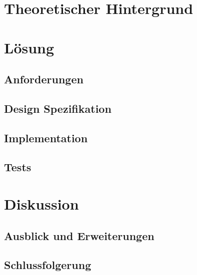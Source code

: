 \documentclass[a4paper,twopage,ngerman,11pt]{scrreprt}
\begin{document}
	\part{Theoretischer Hintergrund}

	\part{Lösung}
		\chapter{Anforderungen}
		\chapter{Design Spezifikation}
		\chapter{Implementation}
		\chapter{Tests}

	\part{Diskussion}
		\chapter{Ausblick und Erweiterungen}
		\chapter{Schlussfolgerung}


	{}
	

\end{document}
